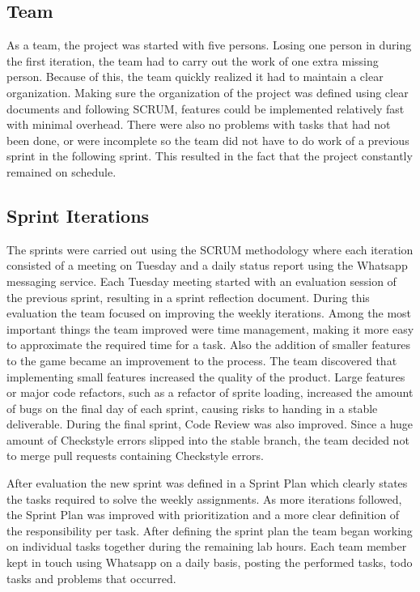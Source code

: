 \documentclass[10pt]{article}
\begin{document}
\subsection*{Team}
As a team, the project was started with five persons. Losing one person in during the first iteration, the team had to carry out the work of one extra missing person. Because of this, the team quickly realized it had to maintain a clear organization. Making sure the organization of the project was defined using clear documents and following SCRUM, features could be implemented relatively fast with minimal overhead. There were also no problems with tasks that had not been done, or were incomplete so the team did not have to do work of a previous sprint in the following sprint. This resulted in the fact that the project constantly remained on schedule.

\subsection*{Sprint Iterations}
The sprints were carried out using the SCRUM methodology where each iteration consisted of a meeting on Tuesday and a daily status report using the Whatsapp messaging service. Each Tuesday meeting started with an evaluation session of the previous sprint, resulting in a sprint reflection document. During this evaluation the team focused on improving the weekly iterations. Among the most important things the team improved were time management, making it more easy to approximate the required time for a task. Also the addition of smaller features to the game became an improvement to the process. The team discovered that implementing small features increased the quality of the product. Large features or major code refactors, such as a refactor of sprite loading, increased the amount of bugs on the final day of each sprint, causing risks to handing in a stable deliverable. During the final sprint, Code Review was also improved. Since a huge amount of Checkstyle errors slipped into the stable branch, the team decided not to merge pull requests containing Checkstyle errors.

After evaluation the new sprint was defined in a Sprint Plan which clearly states the tasks required to solve the weekly assignments. As more iterations followed, the Sprint Plan was improved with prioritization and a more clear definition of the responsibility per task. After defining the sprint plan the team began working on individual tasks together during the remaining lab hours. Each team member kept in touch using Whatsapp on a daily basis, posting the performed tasks, todo tasks and problems that occurred. 
\end{document}
